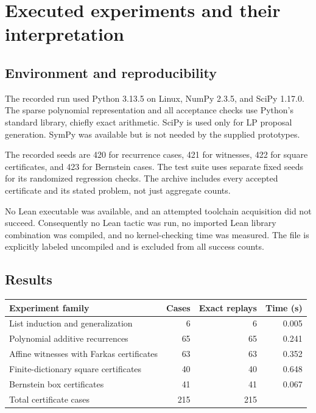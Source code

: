 \section{Executed experiments and their interpretation}

\subsection{Environment and reproducibility}

The recorded run used Python 3.13.5 on Linux, NumPy 2.3.5, and SciPy 1.17.0.
The sparse polynomial representation and all acceptance checks use Python's
standard library, chiefly exact  arithmetic. SciPy is used only
for LP proposal generation. SymPy was available but is not needed by the
supplied prototypes.

The recorded seeds are 420 for recurrence cases, 421 for witnesses, 422 for
square certificates, and 423 for Bernstein cases. The test suite uses separate
fixed seeds for its randomized regression checks. The archive includes every
accepted certificate and its stated problem, not just aggregate counts.

No Lean executable was available, and an attempted toolchain acquisition did
not succeed. Consequently no Lean tactic was run, no imported Lean library
combination was compiled, and no kernel-checking time was measured. The file
 is explicitly labeled uncompiled and is excluded
from all success counts.

\subsection{Results}

\begin{center}
\begin{tabular}{@{}lrrr@{}}
\toprule
Experiment family & Cases & Exact replays & Time (s) \\
\midrule
List induction and generalization & 6 & 6 & 0.005 \\
Polynomial additive recurrences & 65 & 65 & 0.241 \\
Affine witnesses with Farkas certificates & 63 & 63 & 0.352 \\
Finite-dictionary square certificates & 40 & 40 & 0.648 \\
Bernstein box certificates & 41 & 41 & 0.067 \\
\midrule
Total certificate cases & 215 & 215 & \\
\bottomrule
\end{tabular}
\end{center}

